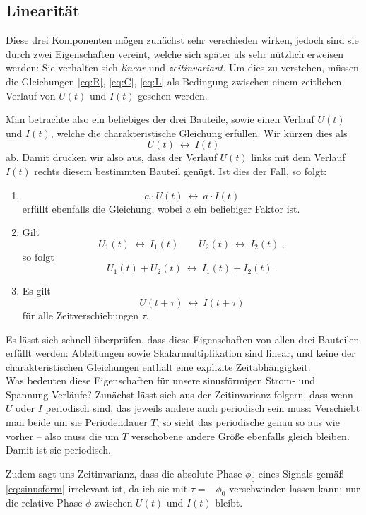 \subsection{Linearität}
Diese drei Komponenten mögen zunächst sehr verschieden wirken, jedoch sind sie durch zwei Eigenschaften vereint, welche
sich später als sehr nützlich erweisen werden: Sie verhalten sich \emph{linear} und \emph{zeitinvariant}. Um dies zu
verstehen, müssen die Gleichungen \eqref{eq:R}, \eqref{eq:C}, \eqref{eq:L} als Bedingung zwischen einem zeitlichen
Verlauf von $U(t)$ und $I(t)$ gesehen werden.

\def\llra{~\longleftrightarrow~}
Man betrachte also ein beliebiges der drei Bauteile, sowie einen Verlauf $U(t)$ und $I(t)$, welche die charakteristische
Gleichung erfüllen. Wir kürzen dies als
$$U(t) \llra I(t)$$
ab. Damit drücken wir also aus, dass der Verlauf $U(t)$ links mit dem Verlauf $I(t)$ rechts diesem bestimmten Bauteil
genügt.
Ist dies der Fall, so folgt:
\begin{enumerate}[label=(\arabic*)]
    \item
        \[ a\cdot U(t) \llra a \cdot I(t) \]
        erfüllt ebenfalls die Gleichung, wobei $a$ ein beliebiger Faktor ist.
    \item Gilt
        \[ U_1(t) \llra I_1(t) \qquad U_2(t) \llra I_2(t) ~,\]
        so folgt
        \[ U_1(t) + U_2(t) \llra I_1(t) + I_2(t) ~. \]
    \item Es gilt
        \[ U(t+\tau) \llra I(t+\tau) \]
        für alle Zeitverschiebungen $\tau$.
\end{enumerate}

Es lässt sich schnell überprüfen, dass diese Eigenschaften von allen drei Bauteilen erfüllt werden: Ableitungen sowie
Skalarmultiplikation sind linear, und keine der charakteristischen Gleichungen enthält eine explizite Zeitabhängigkeit.
\\

Was bedeuten diese Eigenschaften für unsere sinusförmigen Strom- und Spannung-Verläufe? Zunächst lässt sich aus der
Zeitinvarianz folgern, dass wenn $U$ oder $I$ periodisch sind, das jeweils andere auch periodisch sein muss: Verschiebt
man beide um sie Periodendauer $T$, so sieht das periodische genau so aus wie vorher -- also muss die um $T$ verschobene
andere Größe ebenfalls gleich bleiben. Damit ist sie periodisch.

Zudem sagt uns Zeitinvarianz, dass die absolute Phase $\phi_0$ eines Signals gemäß \eqref{eq:sinusform} irrelevant ist,
da ich sie mit $\tau = -\phi_0$ verschwinden lassen kann; nur die relative Phase $\phi$ zwischen $U(t)$ und $I(t)$
bleibt.

